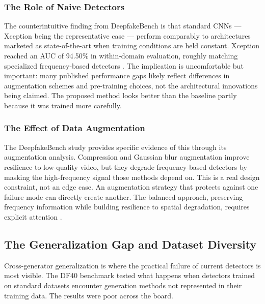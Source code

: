 \subsubsection{The Role of Naive Detectors}
The counterintuitive finding from DeepfakeBench is that standard CNNs — Xception being the representative case — perform comparably to architectures marketed as state-of-the-art when training conditions are held constant. Xception reached an AUC of 94.50\% in within-domain evaluation, roughly matching specialized frequency-based detectors \citep{Chen2024FreqNet}. The implication is uncomfortable but important: many published performance gaps likely reflect differences in augmentation schemes and pre-training choices, not the architectural innovations being claimed. The proposed method looks better than the baseline partly because it was trained more carefully.

\subsubsection{The Effect of Data Augmentation}
The DeepfakeBench study \citep{Yan2023DeepfakeBench} provides specific evidence of this through its augmentation analysis. Compression and Gaussian blur augmentation improve resilience to low-quality video, but they degrade frequency-based detectors by masking the high-frequency signal those methods depend on. This is a real design constraint, not an edge case. An augmentation strategy that protects against one failure mode can directly create another. The balanced approach, preserving frequency information while building resilience to spatial degradation, requires explicit attention \citep{Huang2024FreqBlender}.

\subsection{The Generalization Gap and Dataset Diversity}
Cross-generator generalization is where the practical failure of current detectors is most visible. The DF40 benchmark \citep{Yan2024DF40} tested what happens when detectors trained on standard datasets encounter generation methods not represented in their training data. The results were poor across the board.

